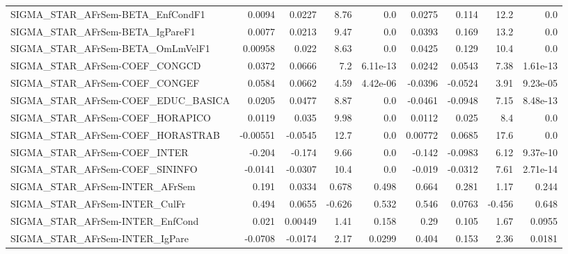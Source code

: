 \begin{tabular}{lrrrrrrrr}
SIGMA\_STAR\_AFrSem-BETA\_EnfCondF1      &      0.0094 &       0.0227 &    8.76 &      0.0 &     0.0275 &       0.114 &         12.2 &           0.0 \\
SIGMA\_STAR\_AFrSem-BETA\_IgPareF1       &      0.0077 &       0.0213 &    9.47 &      0.0 &     0.0393 &       0.169 &         13.2 &           0.0 \\
SIGMA\_STAR\_AFrSem-BETA\_OmLmVelF1      &     0.00958 &        0.022 &    8.63 &      0.0 &     0.0425 &       0.129 &         10.4 &           0.0 \\
SIGMA\_STAR\_AFrSem-COEF\_CONGCD         &      0.0372 &       0.0666 &     7.2 & 6.11e-13 &     0.0242 &      0.0543 &         7.38 &      1.61e-13 \\
SIGMA\_STAR\_AFrSem-COEF\_CONGEF         &      0.0584 &       0.0662 &    4.59 & 4.42e-06 &    -0.0396 &     -0.0524 &         3.91 &      9.23e-05 \\
SIGMA\_STAR\_AFrSem-COEF\_EDUC\_BASICA    &      0.0205 &       0.0477 &    8.87 &      0.0 &    -0.0461 &     -0.0948 &         7.15 &      8.48e-13 \\
SIGMA\_STAR\_AFrSem-COEF\_HORAPICO       &      0.0119 &        0.035 &    9.98 &      0.0 &     0.0112 &       0.025 &          8.4 &           0.0 \\
SIGMA\_STAR\_AFrSem-COEF\_HORASTRAB      &    -0.00551 &      -0.0545 &    12.7 &      0.0 &    0.00772 &      0.0685 &         17.6 &           0.0 \\
SIGMA\_STAR\_AFrSem-COEF\_INTER          &      -0.204 &       -0.174 &    9.66 &      0.0 &     -0.142 &     -0.0983 &         6.12 &      9.37e-10 \\
SIGMA\_STAR\_AFrSem-COEF\_SININFO        &     -0.0141 &      -0.0307 &    10.4 &      0.0 &     -0.019 &     -0.0312 &         7.61 &      2.71e-14 \\
SIGMA\_STAR\_AFrSem-INTER\_AFrSem        &       0.191 &       0.0334 &   0.678 &    0.498 &      0.664 &       0.281 &         1.17 &         0.244 \\
SIGMA\_STAR\_AFrSem-INTER\_CulFr         &       0.494 &       0.0655 &  -0.626 &    0.532 &      0.546 &      0.0763 &       -0.456 &         0.648 \\
SIGMA\_STAR\_AFrSem-INTER\_EnfCond       &       0.021 &      0.00449 &    1.41 &    0.158 &       0.29 &       0.105 &         1.67 &        0.0955 \\
SIGMA\_STAR\_AFrSem-INTER\_IgPare        &     -0.0708 &      -0.0174 &    2.17 &   0.0299 &      0.404 &       0.153 &         2.36 &        0.0181 \\

\end{tabular}
